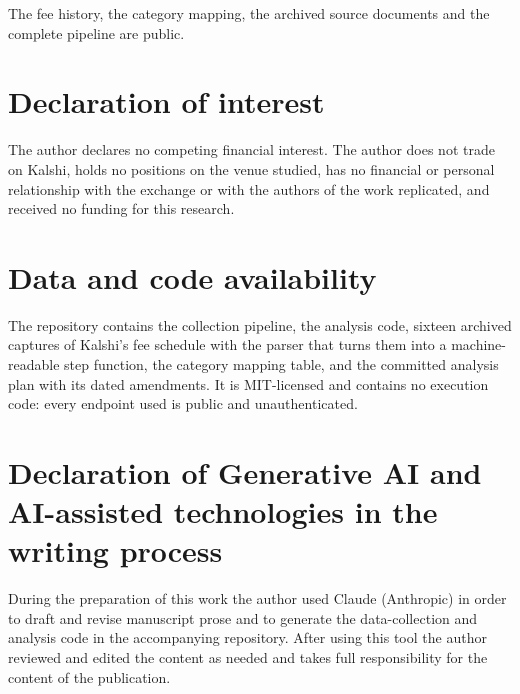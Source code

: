 \documentclass[preprint,12pt,authoryear]{elsarticle}
\begin{document}
The fee history, the category mapping, the archived source documents and the
complete pipeline are public.

\section*{Declaration of interest}

The author declares no competing financial interest. The author does not trade
on Kalshi, holds no positions on the venue studied, has no financial or personal
relationship with the exchange or with the authors of the work replicated, and
received no funding for this research.

\section*{Data and code availability}

The repository contains the collection pipeline, the analysis code, sixteen
archived captures of Kalshi's fee schedule with the parser that turns them into
a machine-readable step function, the category mapping table, and the committed
analysis plan with its dated amendments. It is MIT-licensed and contains no
execution code: every endpoint used is public and unauthenticated.

\section*{Declaration of Generative AI and AI-assisted technologies in the
writing process}

During the preparation of this work the author used Claude (Anthropic) in order
to draft and revise manuscript prose and to generate the data-collection and
analysis code in the accompanying repository. After using this tool the author
reviewed and edited the content as needed and takes full responsibility for the
content of the publication.
\end{document}
